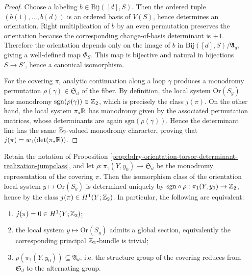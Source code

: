 \begin{proof}
Choose a labeling \(b\in\mathrm{Bij}([d],S)\).
Then the ordered tuple \((b(1),\dots,b(d))\) is an ordered basis of \(V(S)\), hence determines an orientation.
Right multiplication of \(b\) by an even permutation preserves the orientation because the corresponding change-of-basis determinant is \(+1\).
Therefore the orientation depends only on the image of \(b\) in \(\mathrm{Bij}([d],S)/\mathfrak A_d\), giving a well-defined map \(\Phi_S\).
This map is bijective and natural in bijections \(S\to S'\), hence a canonical isomorphism.
\par
For the covering \(\pi\), analytic continuation along a loop \(\gamma\) produces a monodromy permutation \(\rho(\gamma)\in\mathfrak S_d\) of the fiber.
By definition, the local system \(\mathrm{Or}(S_y)\) has monodromy \(\mathrm{sgn}(\rho(\gamma))\in\mathbb{Z}_2\), which is precisely the class \(j(\pi)\).
On the other hand, the local system \(\pi_\ast\mathbb{R}\) has monodromy given by the associated permutation matrices, whose determinants are again \(\mathrm{sgn}(\rho(\gamma))\).
Hence the determinant line has the same \(\mathbb{Z}_2\)-valued monodromy character, proving that
\(
j(\pi)=w_1(\det(\pi_\ast\mathbb{R}))
\). \qedhere
\end{proof}

\begin{corollary}\label{cor:bdry-orientation-local-system-w1-alternating-reduction}
Retain the notation of Proposition \ref{prop:bdry-orientation-torsor-determinant-realization-jumpclass}, and let \(\rho:\pi_1(Y,y_0)\to \mathfrak S_d\) be the monodromy representation of the covering \(\pi\).
Then the isomorphism class of the orientation local system \(y\mapsto \mathrm{Or}(S_y)\) is determined uniquely by \(\mathrm{sgn}\circ \rho:\pi_1(Y,y_0)\to\mathbb{Z}_2\), hence by the class \(j(\pi)\in H^1(Y;\mathbb{Z}_2)\).
In particular, the following are equivalent:
\begin{enumerate}
  \item \(j(\pi)=0\in H^1(Y;\mathbb{Z}_2)\);
  \item the local system \(y\mapsto \mathrm{Or}(S_y)\) admits a global section, equivalently the corresponding principal \(\mathbb{Z}_2\)-bundle is trivial;
  \item \(\rho(\pi_1(Y,y_0))\subseteq \mathfrak A_d\), i.e. the structure group of the covering reduces from \(\mathfrak S_d\) to the alternating group.
\end{enumerate}
\end{corollary}

